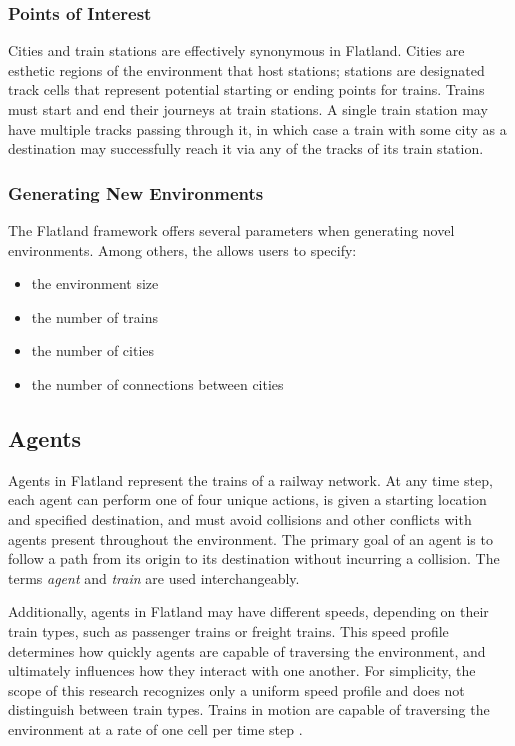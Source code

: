 \documentclass[11pt]{article}
\begin{document}
\subsubsection{Points of Interest}
Cities and train stations are effectively synonymous in Flatland.  Cities are esthetic regions of the environment that host stations; stations are designated track cells that represent potential starting or ending points for trains.  Trains must start and end their journeys at train stations.  A single train station may have multiple tracks passing through it, in which case a train with some city as a destination may successfully reach it via any of the tracks of its train station. \medskip

\subsubsection{Generating New Environments}
\noindent The Flatland framework offers several parameters when generating novel environments.  Among others, the  allows users to specify:
\begin{itemize}
	\item the environment size
	\item the number of trains
	\item the number of cities
	\item the number of connections between cities
\end {itemize}


\subsection{Agents}
\label{sec:Agents}
Agents in Flatland represent the trains of a railway network.  At any time step, each agent can perform one of four unique actions, is given a starting location and specified destination, and must avoid collisions and other conflicts with agents present throughout the environment.  The primary goal of an agent is to follow a path from its origin to its destination without incurring a collision.  The terms \textit{agent} and \textit{train} are used interchangeably.

Additionally, agents in Flatland may have different speeds, depending on their train types, such as passenger trains or freight trains.  This speed profile determines how quickly agents are capable of traversing the environment, and ultimately influences how they interact with one another.  For simplicity, the scope of this research recognizes only a uniform speed profile and does not distinguish between train types.  Trains in motion are capable of traversing the environment at a rate of one cell per time step \citep{baeiegljmomonyspwaaggo21a}.
\end{document}
